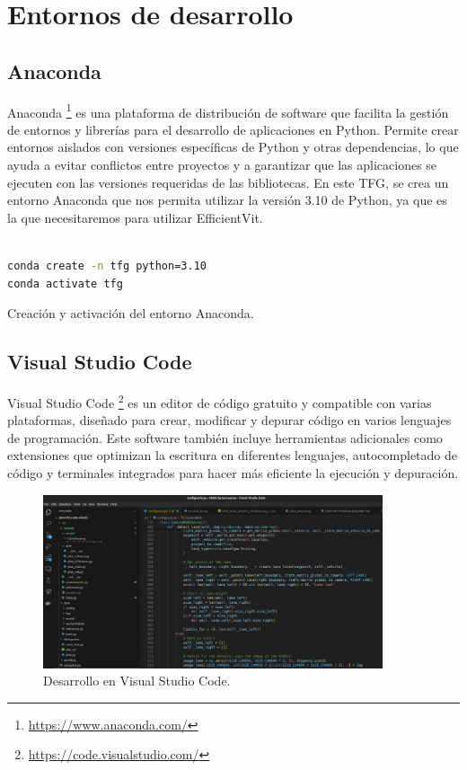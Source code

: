 \section{Entornos de desarrollo}
\label{sec:des}

\subsection{Anaconda}
\label{sec:conda}

Anaconda \footnote{\url{https://www.anaconda.com/}} es una plataforma de distribución de software que facilita la gestión de entornos y librerías para el desarrollo de aplicaciones en Python. Permite crear entornos aislados con versiones específicas de Python y otras dependencias, lo que ayuda a evitar conflictos entre proyectos y a garantizar que las aplicaciones se ejecuten con las versiones requeridas de las bibliotecas. En este \ac{TFG}, se crea un entorno Anaconda que nos permita utilizar la versión 3.10 de Python, ya que es la que necesitaremos para utilizar EfficientVit.

\begin{code}[h]
\begin{lstlisting}[language=bash]

conda create -n tfg python=3.10
conda activate tfg

\end{lstlisting}
\caption[Creación del entorno Anaconda]{Creación y activación del entorno Anaconda.}
\label{cod:anaconda}
\end{code}

\subsection{Visual Studio Code}
\label{sec:vs_code}

Visual Studio Code \footnote{\url{https://code.visualstudio.com/}} es un editor de código gratuito y compatible con varias plataformas, diseñado para crear, modificar y depurar código en varios lenguajes de programación. Este software también incluye herramientas adicionales como extensiones que optimizan la escritura en diferentes lenguajes, autocompletado de código y terminales integrados para hacer más eficiente la ejecución y depuración.

\begin{figure}[ht]
  \begin{center}
    \includegraphics[width=10cm]{figs/Plataformas_Desarollo/visual_code.png}
  \end{center}
  \caption{Desarrollo en Visual Studio Code.}
  \label{foto_code}
\end{figure}

